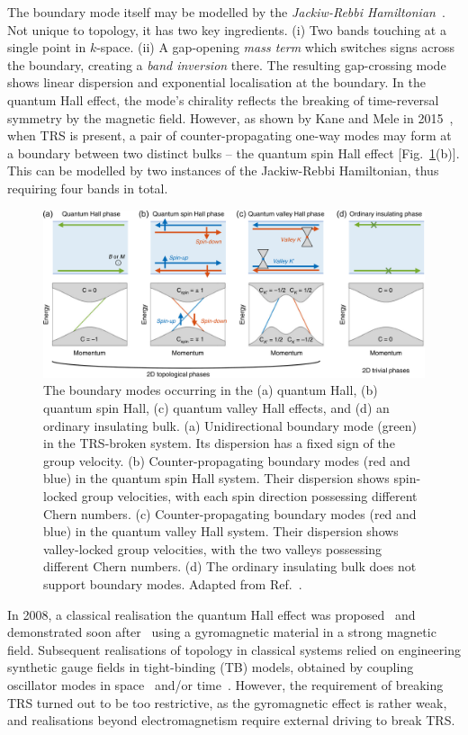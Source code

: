 The boundary mode itself may be modelled by the \textit{Jackiw-Rebbi Hamiltonian}~\cite{Jackiw_1976}. Not unique to topology, it has two key ingredients. (i) Two bands touching at a single point in $k$-space. (ii) A gap-opening \textit{mass term} which switches signs across the boundary, creating a \textit{band inversion} there. The resulting gap-crossing mode shows linear dispersion and exponential localisation at the boundary. In the quantum Hall effect, the mode's chirality reflects the breaking of time-reversal symmetry by the magnetic field. However, as shown by Kane and Mele in 2015~\cite{Kane_Mele_2005}, when TRS is present, a pair of counter-propagating one-way modes may form at a boundary between two distinct bulks -- the quantum spin Hall effect [Fig.~\ref{fig:intro_topo}(b)]. This can be modelled by two instances of the Jackiw-Rebbi Hamiltonian, thus requiring four bands in total.

\begin{figure} [h!]
	\centering
	\includegraphics[width=\textwidth]{figures/intro/topological_phases_edited.png}
	\caption{The boundary modes occurring in the (a) quantum Hall, (b) quantum spin Hall, (c) quantum valley Hall effects, and (d) an ordinary insulating bulk. (a) Unidirectional boundary mode (green) in the TRS-broken system. Its dispersion has a fixed sign of the group velocity. (b) Counter-propagating boundary modes (red and blue) in the quantum spin Hall system. Their dispersion shows spin-locked group velocities, with each spin direction possessing different Chern numbers. (c) Counter-propagating boundary modes (red and blue) in the quantum valley Hall system. Their dispersion shows valley-locked group velocities, with the two valleys possessing different Chern numbers. (d) The ordinary insulating bulk does not support boundary modes. Adapted from Ref.~\cite{Kim_2020}.}
	\label{fig:intro_topo}
\end{figure}

In 2008, a classical realisation the quantum Hall effect was proposed~\cite{Haldane_2008} and demonstrated soon after~\cite{Wang_2008, Wang_2009} using a gyromagnetic material in a strong magnetic field. Subsequent realisations of topology in classical systems relied on engineering synthetic gauge fields in tight-binding (TB) models, obtained by coupling oscillator modes in space~\cite{Kraus_2012, Hafezi_2013} and/or time~\cite{Rechtsman_2013}. However, the requirement of breaking TRS turned out to be too restrictive, as the gyromagnetic effect is rather weak, and realisations beyond electromagnetism require external driving to break TRS. 

